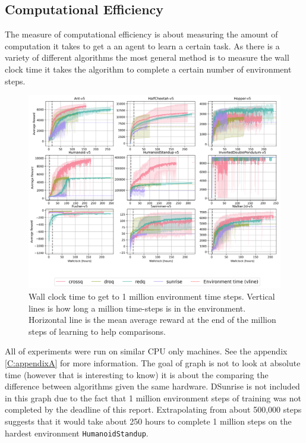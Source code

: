 \subsection{Computational Efficiency}

The measure of computational efficiency is about measuring the amount of computation it takes to get a an agent to learn a certain task. As there is a variety of different algorithms the most general method is to measure the wall clock time it takes the algorithm to complete a certain number of environment steps.

\begin{figure}[H]
    \centering
    \includegraphics[width=1\textwidth]{figures/wall_clock_results.png}
    \caption{Wall clock time to get to 1 million environment time steps. Vertical lines is how long a million time-steps is in the environment. Horizontal line is the mean average reward at the end of the million steps of learning to help comparisons.}
    \label{fig:computational_efficiency}
\end{figure}


All of experiments were run on similar CPU only machines. See the appendix \ref{C:appendixA} for more information. The goal of graph is not to look at absolute time (however that is interesting to know) it is about the comparing the difference between algorithms given the same hardware. DSunrise is not included in this graph due to the fact that 1 million environment steps of training was not completed by the deadline of this report. Extrapolating from about 500,000 steps suggests that it would take about 250 hours to complete 1 million steps on the hardest environment \texttt{HumanoidStandup}. 

